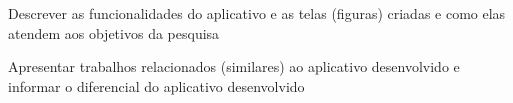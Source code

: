 Descrever as funcionalidades do aplicativo e as telas (figuras) criadas e como elas atendem aos
objetivos da pesquisa

Apresentar trabalhos relacionados (similares) ao aplicativo desenvolvido e informar o diferencial do
aplicativo desenvolvido